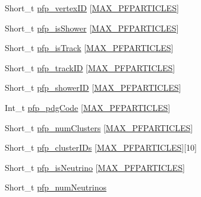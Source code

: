 \begin{DoxyCompactItemize}
\item 
Short\-\_\-t \hyperlink{classanatree_ad5a75b51882d09a1f2160b93b422803f}{pfp\-\_\-vertex\-I\-D} \mbox{[}\hyperlink{anatree__core__v09410002_8h_a357d0a9d7f96df271f39dd025e28c52c}{M\-A\-X\-\_\-\-P\-F\-P\-A\-R\-T\-I\-C\-L\-E\-S}\mbox{]}
\item 
Short\-\_\-t \hyperlink{classanatree_a636b6412cc1a1203638a7764c3f775ec}{pfp\-\_\-is\-Shower} \mbox{[}\hyperlink{anatree__core__v09410002_8h_a357d0a9d7f96df271f39dd025e28c52c}{M\-A\-X\-\_\-\-P\-F\-P\-A\-R\-T\-I\-C\-L\-E\-S}\mbox{]}
\item 
Short\-\_\-t \hyperlink{classanatree_a91e1fe4440087f18342a8bedd2371198}{pfp\-\_\-is\-Track} \mbox{[}\hyperlink{anatree__core__v09410002_8h_a357d0a9d7f96df271f39dd025e28c52c}{M\-A\-X\-\_\-\-P\-F\-P\-A\-R\-T\-I\-C\-L\-E\-S}\mbox{]}
\item 
Short\-\_\-t \hyperlink{classanatree_aa306aab1ad514dfad827195ce75c8eaa}{pfp\-\_\-track\-I\-D} \mbox{[}\hyperlink{anatree__core__v09410002_8h_a357d0a9d7f96df271f39dd025e28c52c}{M\-A\-X\-\_\-\-P\-F\-P\-A\-R\-T\-I\-C\-L\-E\-S}\mbox{]}
\item 
Short\-\_\-t \hyperlink{classanatree_aea4d19fa1d0dea2b6dad3b7e4d3629a9}{pfp\-\_\-shower\-I\-D} \mbox{[}\hyperlink{anatree__core__v09410002_8h_a357d0a9d7f96df271f39dd025e28c52c}{M\-A\-X\-\_\-\-P\-F\-P\-A\-R\-T\-I\-C\-L\-E\-S}\mbox{]}
\item 
Int\-\_\-t \hyperlink{classanatree_ad9219f9993e1bfda63b215e86fe66e31}{pfp\-\_\-pdg\-Code} \mbox{[}\hyperlink{anatree__core__v09410002_8h_a357d0a9d7f96df271f39dd025e28c52c}{M\-A\-X\-\_\-\-P\-F\-P\-A\-R\-T\-I\-C\-L\-E\-S}\mbox{]}
\item 
Short\-\_\-t \hyperlink{classanatree_a512f5c93998c3ba441fef4d586fa7645}{pfp\-\_\-num\-Clusters} \mbox{[}\hyperlink{anatree__core__v09410002_8h_a357d0a9d7f96df271f39dd025e28c52c}{M\-A\-X\-\_\-\-P\-F\-P\-A\-R\-T\-I\-C\-L\-E\-S}\mbox{]}
\item 
Short\-\_\-t \hyperlink{classanatree_a17c2d28621baeb53369be701df92f881}{pfp\-\_\-cluster\-I\-Ds} \mbox{[}\hyperlink{anatree__core__v09410002_8h_a357d0a9d7f96df271f39dd025e28c52c}{M\-A\-X\-\_\-\-P\-F\-P\-A\-R\-T\-I\-C\-L\-E\-S}\mbox{]}\mbox{[}10\mbox{]}
\item 
Short\-\_\-t \hyperlink{classanatree_ab358e8e33cbce902e261f69989af6486}{pfp\-\_\-is\-Neutrino} \mbox{[}\hyperlink{anatree__core__v09410002_8h_a357d0a9d7f96df271f39dd025e28c52c}{M\-A\-X\-\_\-\-P\-F\-P\-A\-R\-T\-I\-C\-L\-E\-S}\mbox{]}
\item 
Short\-\_\-t \hyperlink{classanatree_aa8d83ba725f4d317a1b81a1c6d8e270f}{pfp\-\_\-num\-Neutrinos}

\end{DoxyCompactItemize}
